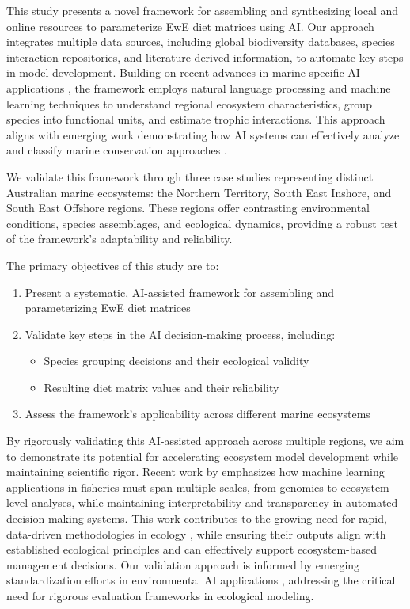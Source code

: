 This study presents a novel framework for assembling and synthesizing local and online resources to parameterize EwE diet matrices using AI. Our approach integrates multiple data sources, including global biodiversity databases, species interaction repositories, and literature-derived information, to automate key steps in model development. Building on recent advances in marine-specific AI applications \citep{Zheng2023}, the framework employs natural language processing and machine learning techniques to understand regional ecosystem characteristics, group species into functional units, and estimate trophic interactions. This approach aligns with emerging work demonstrating how AI systems can effectively analyze and classify marine conservation approaches \citep{Chen2024}.

We validate this framework through three case studies representing distinct Australian marine ecosystems: the Northern Territory, South East Inshore, and South East Offshore regions. These regions offer contrasting environmental conditions, species assemblages, and ecological dynamics, providing a robust test of the framework's adaptability and reliability.

The primary objectives of this study are to:

\begin{enumerate}
    \item Present a systematic, AI-assisted framework for assembling and parameterizing EwE diet matrices
    \item Validate key steps in the AI decision-making process, including:
        \begin{itemize}
            \item Species grouping decisions and their ecological validity
            \item Resulting diet matrix values and their reliability
        \end{itemize}
    \item Assess the framework's applicability across different marine ecosystems
\end{enumerate}

By rigorously validating this AI-assisted approach across multiple regions, we aim to demonstrate its potential for accelerating ecosystem model development while maintaining scientific rigor. Recent work by \citet{Kuhn2024} emphasizes how machine learning applications in fisheries must span multiple scales, from genomics to ecosystem-level analyses, while maintaining interpretability and transparency in automated decision-making systems. This work contributes to the growing need for rapid, data-driven methodologies in ecology \citep{Kelling2009, Michener2012}, while ensuring their outputs align with established ecological principles and can effectively support ecosystem-based management decisions. Our validation approach is informed by emerging standardization efforts in environmental AI applications \citep{Guo2025}, addressing the critical need for rigorous evaluation frameworks in ecological modeling.

